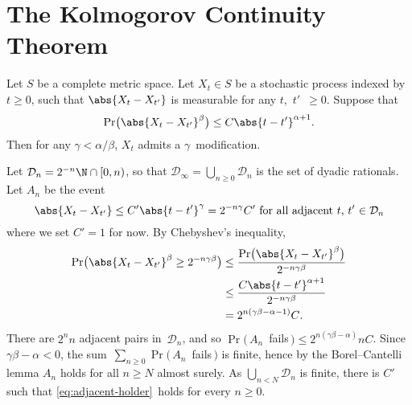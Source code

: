 \section	{The Kolmogorov Continuity Theorem}

\begin	{theorem}
Let $S$ be a complete metric space.
Let \( X_t \in S \) be a stochastic process indexed by \( t \ge 0 \),
such that $\abs{X_t-X_{t'}}$ is measurable for any $t$,~$t'$~$\ge 0$.
Suppose that
\begin	{equation}
\label	{eq:kolmogorov-continuity}
	\Pr\bigl(\abs{X_t-X_{t'}}^\beta\bigr) \le C\abs{t-t'}^{\alpha+1} \text.
\end	{equation}
Then for any \( \gamma < \alpha/\beta \),
$X_t$ admits a $\gamma$\dashHolder\ modification.
\end	{theorem}

Let \( \mathcal D_n = 2^{-n}\N \cap [0,n) \),
so that \( \mathcal D_\infty = \bigcup_{n \ge 0} \mathcal D_n \)
is the set of dyadic rationals.
Let $A_n$ be the event
\begin	{equation}
\label	{eq:adjacent-holder}
	\text{\( \abs{X_t-X_{t'}} \le C'\abs{t-t'}^\gamma = 2^{-n\gamma}C' \)
	for all adjacent $t$,~$t'$~$\in\mathcal D_n$}
\end	{equation}
where we set \( C' = 1 \) for now.
By Chebyshev's inequality,
\begin	{align*}
	\Pr\bigl( \abs{X_t-X_{t'}}^\beta \ge 2^{-n\gamma\beta} \bigr)
	&\le	\frac {\Pr\bigl( \abs{X_t-X_{t'}}^\beta \bigr)}
		              {2^{-n\gamma\beta}}                     \\
	&\le	\frac {C\abs{t-t'}^{\alpha+1}}
		        {2^{-n\gamma\beta}}                           \\
	&=	2^{n(\gamma\beta - \alpha - 1)} C                     \text.
\end	{align*}
There are $2^n n$ adjacent pairs in~$\mathcal D_n$,
and so \( \Pr(\, A_n \)~fails\( \,) \le 2^{n(\gamma\beta-\alpha)} nC \).
Since \( \gamma\beta - \alpha < 0 \),
the sum~\( \sum_{n \ge 0} \Pr(\, A_n \)~fails$\,)$ is finite,
hence by the Borel--Cantelli lemma
$A_n$ holds for all \( n \ge N \) almost surely.
As \( \bigcup_{n<N} \mathcal D_n \) is finite,
there is $C'$ such that \eqref{eq:adjacent-holder}~holds
for every \( n \ge 0 \).

